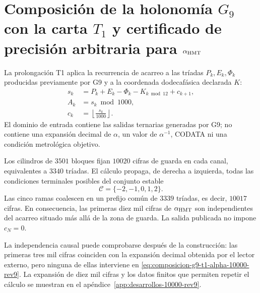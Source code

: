 \section{Composición de la holonomía \(G_9\) con la carta \(T_1\) y certificado de precisión arbitraria para \(\alpha_{\rm HMT}\)}
\label{sec:alpha-t1-10000-rev9}

La prolongación T1 aplica la recurrencia de acarreo a las tríadas
\(P_k,E_k,\Phi_k\) producidas previamente por G9 y a la coordenada
dodecafásica declarada \(K\):
\begin{align}
 s_k&=P_k+E_k-\Phi_k-K_{k\bmod12}+c_{k+1},\\
 A_k&=s_k\bmod1000,\\
 c_k&=\left\lfloor\frac{s_k}{1000}\right\rfloor.
 \label{eq:composicion-g9-t1-alpha-10000-rev9}
\end{align}
El dominio de entrada contiene las salidas ternarias generadas por G9; no
contiene una expansión decimal de \(\alpha\), un valor de
\(\alpha^{-1}\), CODATA ni una condición metrológica objetivo.

Los cilindros de \(3501\) bloques fijan \(10020\) cifras de guarda en cada
canal, equivalentes a \(3340\) tríadas. El cálculo propaga, de derecha a
izquierda, todas las condiciones terminales posibles del conjunto estable
\[
 \mathcal C=\{-2,-1,0,1,2\}.
\]
Las cinco ramas coalescen en un prefijo común de \(3339\) tríadas, es decir,
\(10017\) cifras. En consecuencia, las primeras diez mil cifras de
\(\alpha_{\rm HMT}\) son independientes del acarreo situado más allá de la
zona de guarda. La salida publicada no impone \(c_N=0\).

La independencia causal puede comprobarse después de la construcción: las
primeras tres mil cifras coinciden con la expansión decimal obtenida por el
lector externo, pero ninguna de ellas interviene en
\eqref{eq:composicion-g9-t1-alpha-10000-rev9}. La expansión de diez mil
cifras y los datos finitos que permiten repetir el cálculo se muestran en el
apéndice~\ref{app:desarrollos-10000-rev9}.

